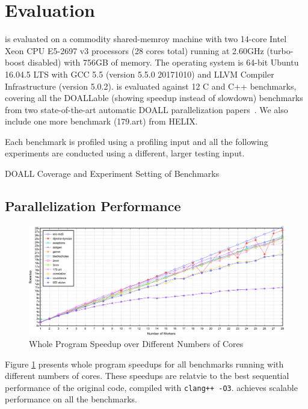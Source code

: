 \section{Evaluation}

\name is evaluated on a commodity shared-memroy machine with two 14-core
Intel Xeon CPU E5-2697 v3 processors (28 cores total) running at 2.60GHz
(turbo-boost disabled) with 756GB of memory. The operating system is 64-bit
Ubuntu 16.04.5 LTS with GCC 5.5 (version 5.5.0 20171010) and LLVM Compiler
Infrastructure (version 5.0.2).
%
\name is evaluated against 12 C and C++ benchmarks, covering all the
DOALLable (showing speedup instead of slowdown) benchmarks from two
state-of-the-art automatic DOALL parallelization
papers~\cite{johnson:12:pldi,kim:12:cgo}. We also include one more
benchmark (179.art) from HELIX.

%
Each benchmark is profiled using a profiling input and all the following
experiments are conducted using a different, larger testing input.

\begin{table}
  
  \caption{
    DOALL Coverage and Experiment Setting of Benchmarks
  }
  \label{tab:benchmark-list}
    \vspace{-5pt}
\end{table}

\subsection{Parallelization Performance}

\begin{figure}[ht]
  \includegraphics[width=\textwidth]{figures/multi-core-crop}
  \caption{Whole Program Speedup over Different Numbers of Cores}
  \label{fig:multi-core-scale}
\end{figure}

Figure \ref{fig:multi-core-scale} presents whole program speedups for
all benchmarks running with different numbers of cores. These speedups are
relatvie to the best sequential performance of the original code, compiled
with \texttt{clang++ -O3}. \name achieves scalable performance on all the
benchmarks.

